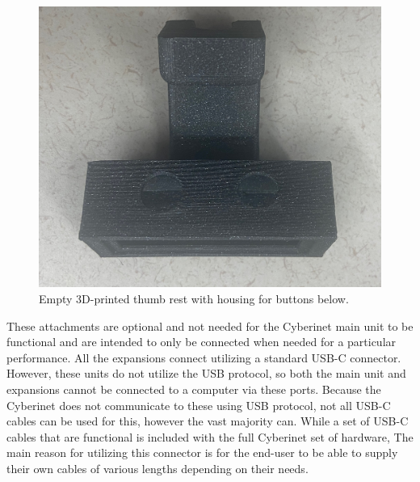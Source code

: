 \begin{center}
    \begin{figure}
        \centering
        \includegraphics[scale=0.1]{diagrams/builtUnits/buttonhousingEmpty.JPG}
        \caption{Empty 3D-printed thumb rest with housing for buttons below.}
        \label{fig:buttonThumbrest}
    \end{figure}
\end{center}

These attachments are optional and not needed for the Cyberinet main unit to be functional and are intended to only be connected when needed for a particular performance. All the expansions connect utilizing a standard USB-C connector. However, these units do not utilize the USB protocol, so both the main unit and expansions cannot be connected to a computer via these ports. Because the Cyberinet does not communicate to these using USB protocol, not all USB-C cables can be used for this, however the vast majority can. While a set of USB-C cables that are functional is included with the full Cyberinet set of hardware, The main reason for utilizing this connector is for the end-user to be able to supply their own cables of various lengths depending on their needs. 


